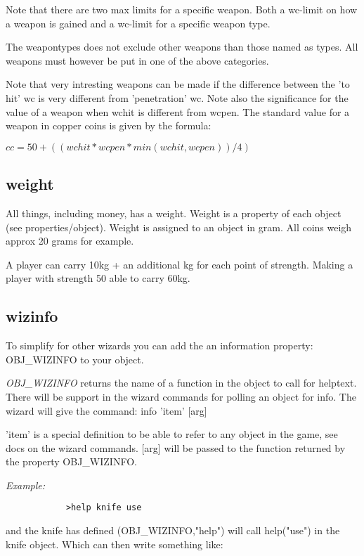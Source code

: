 Note that there are two max limits for a specific weapon. Both a wc-limit
on how a weapon is gained and a wc-limit for a specific weapon type.

The weapontypes does not exclude other weapons than those named as types. 
All weapons must however be put in one of the above categories.

Note that very intresting weapons can be made if the difference between
the 'to hit' wc is very different from 'penetration' wc. Note also the
significance for the value of a weapon when wchit is different from
wcpen. The standard value for a weapon in copper coins is given by
the formula:

        $cc = 50 + ((wchit * wcpen * min(wchit,wcpen)) / 4)$


\subsection{weight}

All things, including money, has a weight. Weight is a property of each
object (see properties/object). Weight is assigned to an object in gram.
All coins weigh approx 20 grams for example.

A player can carry 10kg + an additional kg for each point of strength. Making
a player with strength 50 able to carry 60kg. 


\subsection{wizinfo}

    To simplify for other wizards you can add the an information 
    property: OBJ\_WIZINFO to your object.

    {\em OBJ\_WIZINFO}  returns the name of a function in the object to call
    for helptext. There will be support in the wizard
    commands for polling an object for info. The wizard
    will give the command: info 'item' [arg]

    'item' is a special definition to be able to refer
    to any object in the game, see docs on the wizard
    commands. [arg] will be passed to the function
    returned by the property OBJ\_WIZINFO.

    {\em Example:}
    
\begin{verbatim}
            >help knife use
\end{verbatim}

            and the knife has defined (OBJ\_WIZINFO,"help")
            will call help("use") in the knife object. Which can
            then write something like:

